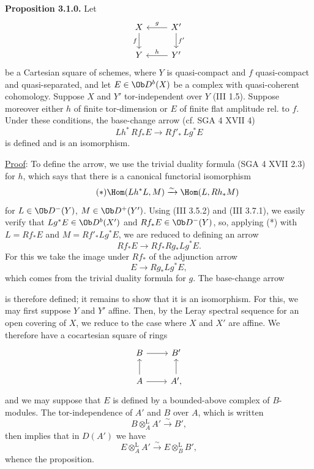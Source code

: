 \textbf{Proposition 3.1.0.} Let
\[
\begin{tikzcd}
X \arrow[d,"f"'] & X' \arrow[l,"g"']\arrow[d,"f'"]\\
Y & Y' \arrow[l,"h"']
\end{tikzcd}
\]
be a Cartesian square of schemes, where \(Y\) is quasi-compact and \(f\) quasi-compact and quasi-separated, and let \(E\in\Ob D^b(X)\) be a complex with quasi-coherent cohomology. Suppose \(X\) and \(Y'\) tor-independent over \(Y\) (III 1.5). Suppose moreover either \(h\) of finite tor-dimension or \(E\) of finite flat amplitude rel. to \(f\). Under these conditions, the base-change arrow (cf. SGA 4 XVII 4)
\[
 Lh^*\,Rf_*E\longrightarrow Rf'_*\,Lg^*E
\]
is defined and is an isomorphism.

\uline{Proof}: To define the arrow, we use the trivial duality formula (SGA 4 XVII 2.3) for \(h\), which says that there is a canonical functorial isomorphism
\begin{equation}\tag{$*$}
 \Hom(Lh^*L,M)\xrightarrow{\sim}\Hom(L,Rh_*M)
\end{equation}
for \(L\in\Ob D^-(Y)\), \(M\in\Ob D^+(Y')\). Using (III 3.5.2) and (III 3.7.1), we easily verify that \(Lg^*E\in\Ob D^b(X')\) and \(Rf_*E\in\Ob D^-(Y)\), so, applying (*) with \(L=Rf_*E\) and \(M=Rf'_*Lg^*E\), we are reduced to defining an arrow
\[
 Rf_*E\longrightarrow Rf_*Rg_*Lg^*E.
\]
For this we take the image under \(Rf_*\) of the adjunction arrow
\[
 E\longrightarrow Rg_*Lg^*E,
\]
which comes from the trivial duality formula for \(g\). The base-change arrow

%
is therefore defined; it remains to show that it is an isomorphism. For this, we may first suppose \(Y\) and \(Y'\) affine. Then, by the Leray spectral sequence for an open covering of \(X\), we reduce to the case where \(X\) and \(X'\) are affine. We therefore have a cocartesian square of rings
\[
\begin{tikzcd}
B\arrow[r] & B'\\
A\arrow[u]\arrow[r] & A'\arrow[u],
\end{tikzcd}
\]
and we may suppose that \(E\) is defined by a bounded-above complex of \(B\)-modules. The tor-independence of \(A'\) and \(B\) over \(A\), which is written
\[
 B\otimes_A^{\mathrm L}A'\xrightarrow{\sim}B',
\]
then implies that in \(D(A')\) we have
\[
 E\otimes_A^{\mathrm L}A'\xrightarrow{\sim}E\otimes_B^{\mathrm L}B',
\]
whence the proposition.

